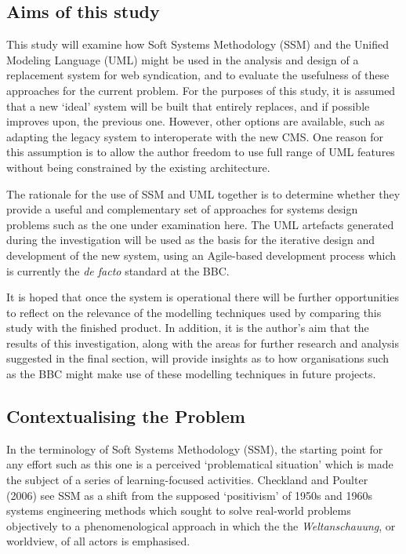 \documentclass[a4paper]{article}
\begin{document}
\subsection{Aims of this study}

This study will examine how Soft Systems Methodology (SSM) and the Unified Modeling Language (UML) might be used in the analysis and design of a replacement system for web syndication, and to evaluate the usefulness of these approaches for the current problem. For the purposes of this study, it is assumed that a new `ideal' system will be built that entirely replaces, and if possible improves upon, the previous one. However, other options are available, such as adapting the legacy system to interoperate with the new CMS. One reason for this assumption is to allow the author freedom to use full range of UML features without being constrained by the existing architecture.

The rationale for the use of SSM and UML together is to determine whether they provide a useful and complementary set of approaches for systems design problems such as the one under examination here. The UML artefacts generated during the investigation will be used as the basis for the iterative design and development of the new system, using an Agile-based development process which is currently the \textit{de facto} standard at the BBC.

It is hoped that once the system is operational there will be further opportunities to reflect on the relevance of the modelling techniques used by comparing this study with the finished product. In addition, it is the author's aim that the results of this investigation, along with the areas for further research and analysis suggested in the final section, will provide insights as to how organisations such as the BBC might make use of these modelling techniques in future projects.

\subsection{Contextualising the Problem}

In the terminology of Soft Systems Methodology (SSM), the starting point for any effort such as this one is a perceived `problematical situation' which is made the subject of a series of learning-focused activities. Checkland and Poulter (2006) see SSM as a shift from the supposed `positivism' of 1950s and 1960s systems engineering methods which sought to solve real-world problems objectively to a phenomenological approach in which the the \textit{Weltanschauung}, or worldview, of all actors is emphasised.
\end{document}
